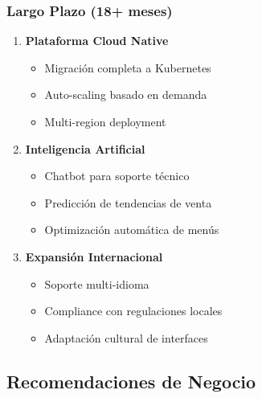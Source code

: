 \documentclass[12pt,a4paper]{article}
\begin{document}
\subsubsection{Largo Plazo (18+ meses)}
\begin{enumerate}
    \item \textbf{Plataforma Cloud Native}
    \begin{itemize}
        \item Migración completa a Kubernetes
        \item Auto-scaling basado en demanda
        \item Multi-region deployment
    \end{itemize}
    
    \item \textbf{Inteligencia Artificial}
    \begin{itemize}
        \item Chatbot para soporte técnico
        \item Predicción de tendencias de venta
        \item Optimización automática de menús
    \end{itemize}
    
    \item \textbf{Expansión Internacional}
    \begin{itemize}
        \item Soporte multi-idioma
        \item Compliance con regulaciones locales
        \item Adaptación cultural de interfaces
    \end{itemize}
\end{enumerate}

\subsection{Recomendaciones de Negocio}
\end{document}
